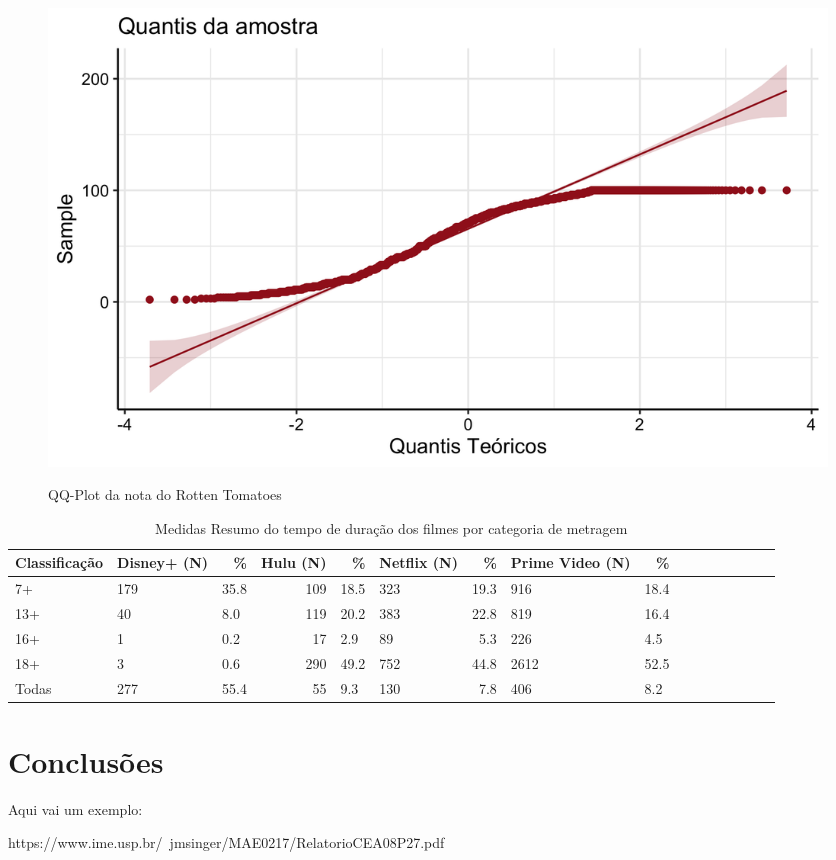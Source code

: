 \documentclass[a4paper, 12pt]{article} %
\begin{document}
\begin{figure}[H]
    \centering
    \caption{QQ-Plot da nota do Rotten Tomatoes}
    \includegraphics[scale=0.15]{Fig_Rotten_QQ.png}
    \label{fig:my_label}
\end{figure}


\begin{table}[H]
\caption{Medidas Resumo do tempo de duração dos filmes por categoria de metragem}
\centering
\begin{tabular}{lllrllrllrllrlll}
\hline
\multicolumn{1}{l|}{\textbf{Classificação}} &
\multicolumn{1}{r}{\textbf{Disney+ (N)}} &
\multicolumn{1}{r}{\textbf{\%}} &
\multicolumn{1}{r}{\textbf{Hulu (N)}}&
\multicolumn{1}{r}{\textbf{\%}}&
\multicolumn{1}{r}{\textbf{Netflix (N)}}&
\multicolumn{1}{r}{\textbf{\%}}&
\multicolumn{1}{r}{\textbf{Prime Video (N)}}&
\multicolumn{1}{r}{\textbf{\%}}\\
\hline

 7+ & 179 & 35.8 & 109 & 18.5 & 323 & 19.3 & 916 & 18.4 \\
 13+ &  40 & 8.0 & 119 & 20.2 & 383 & 22.8 & 819 & 16.4 \\
 16+ & 1 & 0.2 & 17 & 2.9 & 89 & 5.3 & 226 & 4.5  \\
 18+ & 3 & 0.6 & 290 & 49.2 & 752 & 44.8 & 2612 & 52.5   \\
Todas &  277 & 55.4 &  55 & 9.3 &  130 & 7.8 &  406 & 8.2  \\
\hline
\end{tabular}
\end{table}

\section{Conclusões}

Aqui vai um exemplo: 

https://www.ime.usp.br/~jmsinger/MAE0217/RelatorioCEA08P27.pdf
\end{document}
